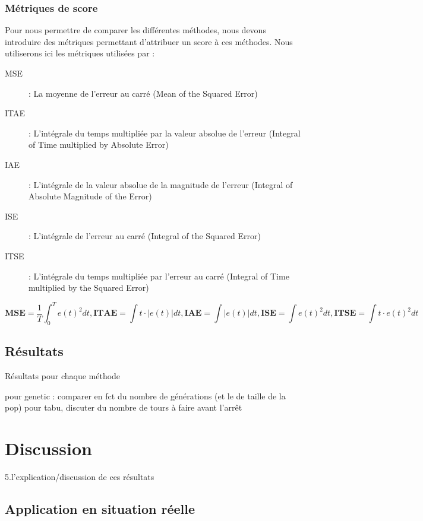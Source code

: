 \documentclass[a4paper,10pt]{report}
\begin{document}
\subsection{Métriques de score}
\label{section:metrics}
Pour nous permettre de comparer les différentes méthodes, nous devons introduire des métriques permettant d'attribuer un score à ces méthodes.
Nous utiliserons ici les métriques utilisées par \cite{griffin2003line, mirzal2012pid} :
\begin{description}
    \item[MSE] : La moyenne de l'erreur au carré (Mean of the Squared Error)
    \item[ITAE] : L'intégrale du temps multipliée par la valeur absolue de l'erreur  (Integral of Time multiplied by Absolute Error)
    \item[IAE] : L'intégrale de la valeur absolue de la magnitude de l'erreur (Integral of Absolute Magnitude of the Error)
    \item[ISE] : L'intégrale de l'erreur au carré (Integral of the Squared Error)
    \item[ITSE] : L'intégrale du temps multipliée par l'erreur au carré (Integral of Time multiplied by the Squared Error)
\end{description}

$$
\textbf{MSE} = \frac{1}{T} \int_0^T e(t)^2 dt,
\textbf{ITAE} = \int t \cdot |e(t)| dt,
\textbf{IAE} = \int |e(t)| dt,
\textbf{ISE} = \int e(t)^2 dt,
\textbf{ITSE} = \int t \cdot e(t)^2 dt
$$


\section{Résultats}
Résultats pour chaque méthode

pour genetic : comparer en fct du nombre de générations (et le de taille de la pop)
pour tabu, discuter du nombre de tours à faire avant l'arrêt

\chapter{Discussion}
5.l’explication/discussion de ces résultats

\section{Application en situation réelle}

\end{document}
